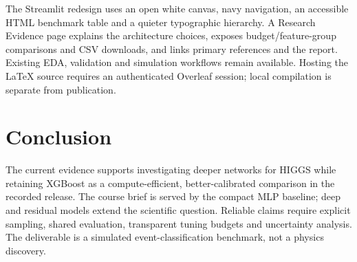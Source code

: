 \documentclass[11pt,a4paper]{article}
\begin{document}
The Streamlit redesign uses an open white canvas, navy navigation, an accessible HTML benchmark table and a quieter typographic hierarchy. A Research Evidence page explains the architecture choices, exposes budget/feature-group comparisons and CSV downloads, and links primary references and the report. Existing EDA, validation and simulation workflows remain available. Hosting the LaTeX source requires an authenticated Overleaf session; local compilation is separate from publication.

\section{Conclusion}
The current evidence supports investigating deeper networks for HIGGS while retaining XGBoost as a compute-efficient, better-calibrated comparison in the recorded release. The course brief is served by the compact MLP baseline; deep and residual models extend the scientific question. Reliable claims require explicit sampling, shared evaluation, transparent tuning budgets and uncertainty analysis. The deliverable is a simulated event-classification benchmark, not a physics discovery.



\end{document}
